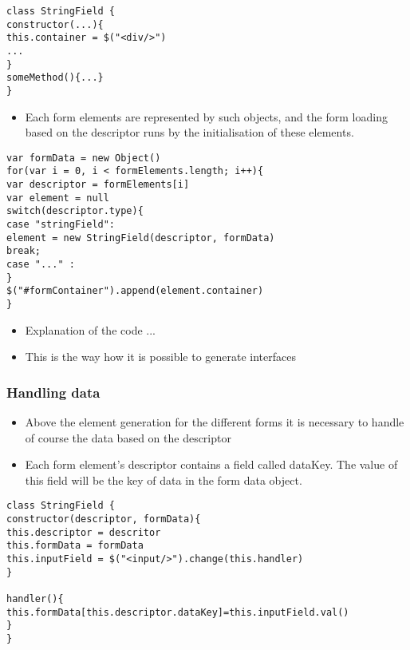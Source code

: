 \begin{lstlisting}[basicstyle=\footnotesize, frame=single, caption={JavaScript class}, captionpos=b]
class StringField {
constructor(...){
this.container = $("<div/>")
...
}
someMethod(){...}			
}
\end{lstlisting}

\begin{itemize}
	\item Each form elements are represented by such objects, and the form loading based on the descriptor runs by the initialisation of these elements.  
\end{itemize}

\begin{lstlisting}[basicstyle=\footnotesize, frame=single, caption={Form generation based on configuration data}, captionpos=b]
var formData = new Object()
for(var i = 0, i < formElements.length; i++){
var descriptor = formElements[i]
var element = null
switch(descriptor.type){
case "stringField":
element = new StringField(descriptor, formData)
break;
case "..." : 
}
$("#formContainer").append(element.container)
}	
\end{lstlisting}



\begin{itemize}
	\item Explanation of the code ...
	\item This is the way how it is possible to generate interfaces
\end{itemize}


\subsubsection{Handling data}

\begin{itemize}
	\item Above the element generation for the different forms it is necessary to handle of course the data based on the descriptor
	\item Each form element's descriptor contains a field called dataKey. The value of this field will be the key of data in the form data object.
\end{itemize}


\begin{lstlisting}[basicstyle=\footnotesize, frame=single, caption={Data saving}, captionpos=b]
class StringField {
constructor(descriptor, formData){
this.descriptor = descritor
this.formData = formData
this.inputField = $("<input/>").change(this.handler)
}

handler(){
this.formData[this.descriptor.dataKey]=this.inputField.val() 
}			
}
\end{lstlisting}



